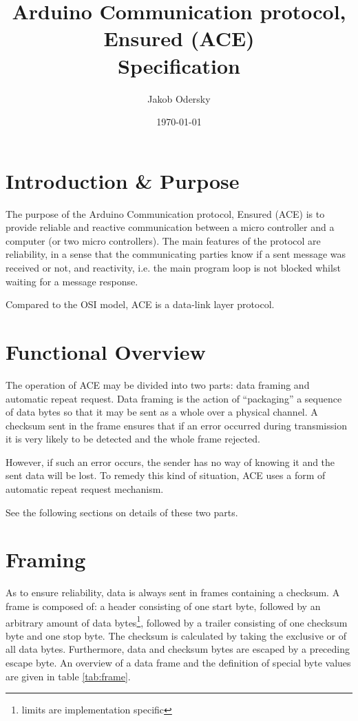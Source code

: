 \documentclass[10pt,a4paper]{article}
\title{Arduino Communication protocol, Ensured (ACE)\\Specification}
\date{\today}
\author{Jakob Odersky}
\begin{document}
\maketitle
\pagestyle{plain}

\section{Introduction \& Purpose}
The purpose of the Arduino Communication protocol, Ensured (ACE) is to provide reliable and reactive communication between a micro controller and a computer (or two micro controllers). The main features of the protocol are reliability, in a sense that the communicating parties know if a sent message was received or not, and reactivity, i.e. the main program loop is not blocked whilst waiting for a message response.

Compared to the OSI model, ACE is a data-link layer protocol.

\section{Functional Overview}
The operation of ACE may be divided into two parts: data framing and automatic repeat request. Data framing is the action of ``packaging'' a sequence of data bytes so that it may be sent as a whole over a physical channel. A checksum sent in the frame ensures that if an error occurred during transmission it is very likely to be detected and the whole frame rejected.

However, if such an error occurs, the sender has no way of knowing it and the sent data will be lost. To remedy this kind of situation, ACE uses a form of automatic repeat request mechanism.

See the following sections on details of these two parts.

\section{Framing}
As to ensure reliability, data is always sent in frames containing a checksum. A frame is composed of: a header consisting of one start byte, followed by an arbitrary amount of data bytes\footnote{limits are implementation specific}, followed by a trailer consisting of one checksum byte and one stop byte. The checksum is calculated by taking the exclusive or of all data bytes. Furthermore, data and checksum bytes are escaped by a preceding escape byte. An overview of a data frame and the definition of special byte values are given in table \ref{tab:frame}.
\end{document}
